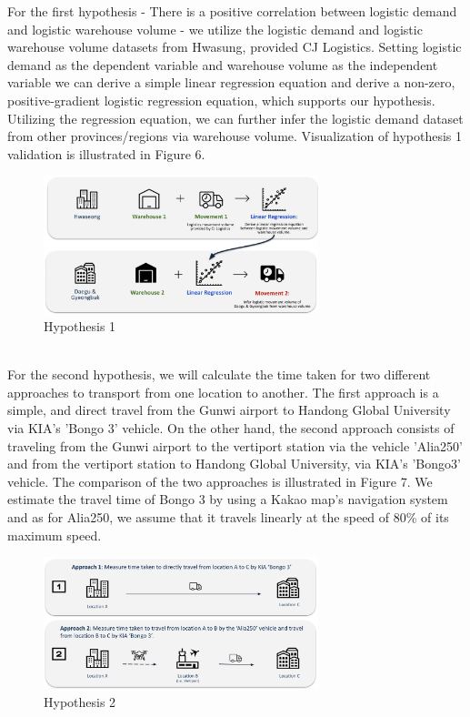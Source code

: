 \documentclass[11pt]{article}
\begin{document}
    For the first hypothesis - There is a positive correlation between logistic demand and logistic warehouse volume - we utilize the logistic demand and logistic warehouse volume datasets from Hwasung, provided CJ Logistics. Setting logistic demand as the dependent variable and warehouse volume as the independent variable we can derive a simple linear regression equation and derive a non-zero, positive-gradient logistic regression equation, which supports our hypothesis. Utilizing the regression equation, we can further infer the logistic demand dataset from other provinces/regions via warehouse volume. Visualization of hypothesis 1 validation is illustrated in Figure 6. \\

     \begin{figure}[H]
        \centering
        \includegraphics[width = 8cm]{./figure/hypothesis1.png}
        \caption{Hypothesis 1}
        \label{fig:enter-label}
    \end{figure}
    \\

    For the second hypothesis, we will calculate the time taken for two different approaches to transport from one location to another. The first approach is a simple, and direct travel from the Gunwi airport to Handong Global University via KIA's 'Bongo 3' vehicle. On the other hand, the second approach consists of traveling from the Gunwi airport to the vertiport station via the vehicle 'Alia250' and from the vertiport station to Handong Global University, via KIA's 'Bongo3' vehicle. The comparison of the two approaches is illustrated in Figure 7. We estimate the travel time of Bongo 3 by using a Kakao map's navigation system and as for Alia250, we assume that it travels linearly at the speed of 80\% of its maximum speed.\\
    
    \begin{figure}[H]
        \centering
        \includegraphics[width = 8cm]{./figure/hypothesis2.png}
        \caption[width = 10cm]{Hypothesis 2}
        \label{fig:enter-label}
    \end{figure}
\end{document}
